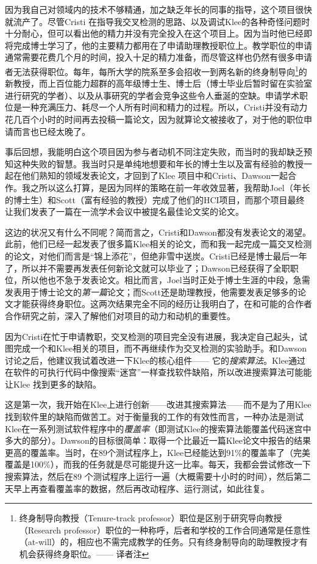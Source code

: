 \documentclass[12pt,UTF8,nofonts]{book}
\begin{document}
因为我自己对领域内的技术不够精通，加之缺乏年长的同事的指导，这个项目很快就流产了。尽管Cristi 在指导我交叉检测的思路、以及调试Klee的各种奇怪问题时十分耐心，但可以看出他的精力并没有完全投入在这个项目上。因为当时他已经即将完成博士学习了，他的主要精力都用在了申请助理教授职位上。教学职位的申请通常需要花费几个月的时间，投入十足的精力准备，而尽管这样也仍然有很多申请者无法获得职位。每年，每所大学的院系至多会招收一到两名新的终身制导向\footnote{终身制导向教授（Tenure-track professor）职位是区别于研究导向教授（Research professor）职位的一种称呼，后者和学校的工作合同通常是任意性（at-will）的，相应也不需完成教学的任务。只有终身制导向的助理教授才有机会获得终身职位。—— 译者注}的新教授，而上百位能力超群的高年级博士生、博士后（博士毕业后暂时留在实验室进行研究的学者）、以及从事研究的学者会竞争这些令人垂涎的空缺。申请学术职位是一种充满压力、耗尽一个人所有时间和精力的过程。所以，Cristi并没有动力花几百个小时的时间再去投稿一篇论文，因为就算论文被接收了，对于他的职位申请而言也已经太晚了。

事后回想，我能明白这个项目因为参与者动机不同注定失败，而当时的我却缺乏预知这种失败的智慧。我当时只是单纯地想要和年长的博士生以及富有经验的教授一起在他们熟知的领域发表论文，才回到了Klee 项目中和Cristi、Dawson一起合作。我之所以这么打算，是因为同样的策略在前一年收效显著，我帮助Joel（年长的博士生）和Scott（富有经验的教授）完成了他们的HCI项目，而那个项目最终让我们发表了一篇在一流学术会议中被提名最佳论文奖的论文。

这边的状况又有什么不同呢？简而言之，Cristi和Dawson都没有发表论文的渴望。此前，他们已经一起发表了很多篇Klee相关的论文，而和我一起完成一篇交叉检测的论文，对他们而言是“锦上添花”，但绝非雪中送炭。Cristi已经是博士最后一年了，所以并不需要再发表任何新论文就可以毕业了；Dawson已经获得了全职职位，所以他也不急于发表论文。相比而言，Joel当时正处于博士生涯的中段，急需发表用于博士论文的\emph{第一篇}论文；而Scott还是助理教授，他需要发表足够多的论文才能获得终身职位。这两次结果完全不同的经历让我明白了，在和可能的合作者合作研究之前，深入了解他们对项目的动力和动机的重要性。

\breakline

因为Cristi在忙于申请教职，交叉检测的项目完全没有进展，我决定自己起头，试图完成一个和Klee相关的项目，而不再继续作为交叉检测的实验助手。和Dawson讨论之后，他建议我试着改进一下Klee的核心组件—— 它的\emph{搜索算法}。Klee通过在软件的可执行代码中像搜索“迷宫”一样查找软件缺陷，所以改进搜索算法可能能让Klee 找到更多的缺陷。

这是第一次，我开始在Klee上进行创新——改进其搜索算法——而不是为了用Klee找到软件里的缺陷而做苦工。对于衡量我的工作的有效性而言，一种办法是测试Klee在一系列测试软件程序中的\emph{覆盖率}（即测试Klee的搜索算法能覆盖代码迷宫中多大的部分）。Dawson的目标很简单：取得一个比最近一篇Klee论文中报告的结果更高的覆盖率。当时，在89个测试程序上，Klee已经能达到91\%的覆盖率了（完美覆盖是100\%），而我的任务就是尽可能提升这一比率。每天，我都会尝试修改一下搜索算法，然后在89 个测试程序上运行一遍（大概需要十小时的时间），然后第二天早上再查看覆盖率的数据，然后再改动程序、运行测试，如此往复。
\end{document}
